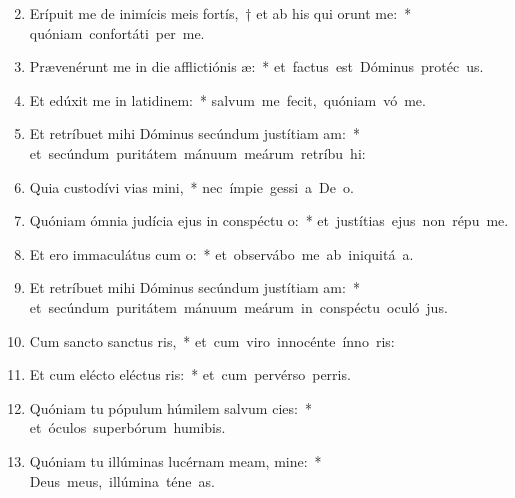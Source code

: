 \begin{flushleft}
\begin{enumerate}[leftmargin=*]
\setcounter{enumi}{1}

\item Erípuit me de inimícis meis fortís,~† et ab his qui orunt me:~* \mbox{quóniam confortáti  per me.}

\item Prævenérunt me in die afflictiónis æ:~* \mbox{et factus est Dóminus protéc us.}

\item Et edúxit me in latidinem:~* \mbox{salvum me fecit, quóniam vó me.}

\item Et retríbuet mihi Dóminus secúndum justítiam am:~* \mbox{et secúndum puritátem mánuum meárum retríbu hi:}

\item Quia custodívi vias mini,~* \mbox{nec ímpie gessi a De o.}

\item Quóniam ómnia judícia ejus in conspéctu o:~* \mbox{et justítias ejus non répu  me.}

\item Et ero immaculátus cum o:~* \mbox{et observábo me ab iniquitá a.}

\item Et retríbuet mihi Dóminus secúndum justítiam am:~* \mbox{et secúndum puritátem mánuum meárum in conspéctu oculó jus.}

\item Cum sancto sanctus ris,~* \mbox{et cum viro innocénte ínno ris:}

\item Et cum elécto eléctus ris:~* \mbox{et cum pervérso perris.}

\item Quóniam tu pópulum húmilem salvum cies:~* \mbox{et óculos superbórum humibis.}

\item Quóniam tu illúminas lucérnam meam, mine:~* \mbox{Deus meus, illúmina téne as.}


\end{enumerate}
\end{flushleft}
